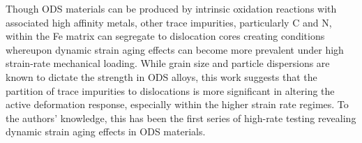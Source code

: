 	Though ODS materials can be produced by intrinsic oxidation reactions with associated high affinity metals, other trace impurities, particularly C and N, within the Fe matrix can segregate to dislocation cores creating conditions whereupon dynamic strain aging effects can become more prevalent under high strain-rate mechanical loading. While grain size and particle dispersions are known to dictate the strength in ODS alloys, this work suggests that the partition of trace impurities to dislocations is more significant in altering the active deformation response, especially within the higher strain rate regimes. To the authors’ knowledge, this has been the first series of high-rate testing revealing dynamic strain aging effects in ODS materials.   



